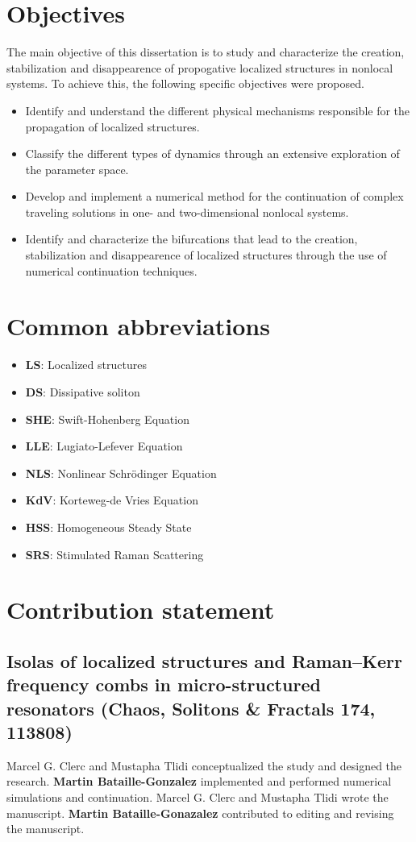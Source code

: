 \section{Objectives}
The main objective of this dissertation is to study and characterize the creation, stabilization and disappearence
of propogative localized structures in nonlocal systems. To achieve this, the following specific objectives were proposed.
\begin{itemize}
  \item Identify and understand the different physical mechanisms responsible for the propagation of
  localized structures.
  \item Classify the different types of dynamics through an extensive exploration of the parameter space.
  \item Develop and implement a numerical method for the continuation of complex traveling solutions in
  one- and two-dimensional nonlocal systems.
  \item Identify and characterize the bifurcations that lead to the creation, stabilization and disappearence 
  of localized structures through the use of numerical continuation techniques.
\end{itemize}

\section{Common abbreviations}

\begin{itemize}
  \item {\bf LS}: Localized structures
  \item {\bf DS}: Dissipative soliton
  \item {\bf SHE}: Swift-Hohenberg Equation
  \item {\bf LLE}: Lugiato-Lefever Equation
  \item {\bf NLS}: Nonlinear Schrödinger Equation
  \item {\bf KdV}: Korteweg-de Vries Equation
  \item {\bf HSS}: Homogeneous Steady State
  \item {\bf SRS}: Stimulated Raman Scattering
\end{itemize}

\section{Contribution statement}

\subsection{Isolas of localized structures and Raman–Kerr frequency combs in micro-structured resonators (Chaos, Solitons \& Fractals 174, 113808)}
Marcel G. Clerc and Mustapha Tlidi conceptualized the study and designed the research. 
{\bf Martin Bataille-Gonzalez} implemented and performed numerical simulations and continuation. 
Marcel G. Clerc and Mustapha Tlidi wrote the manuscript. {\bf Martin Bataille-Gonazalez} 
contributed to editing and revising the manuscript.


